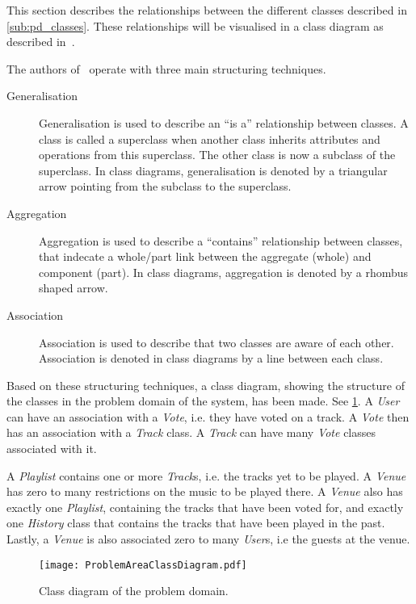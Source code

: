 This section describes the relationships between the different classes
described in \cref{sub:pd_classes}. These relationships will be
visualised in a class diagram as described
in~.

The authors of~ operate with three
main structuring techniques.

\begin{description}
\item[Generalisation] Generalisation is used to describe an \enquote{is a}
  relationship between classes. A class is called a
  superclass when another class inherits attributes and operations
  from this superclass. The other class is now a subclass of the
  superclass. In class diagrams, generalisation is denoted by a
  triangular arrow pointing from the subclass to the superclass.
\item[Aggregation] Aggregation is used to describe a
  \enquote{contains} relationship between classes, that indecate a whole/part link between the aggregate (whole) and component (part).  In class diagrams,
  aggregation is denoted by a rhombus shaped arrow.
\item[Association] Association is used to describe that two classes
  are aware of each other. Association is denoted in class diagrams by
  a line between each class.
\end{description}

Based on these structuring techniques, a class diagram, showing the
structure of the classes in the problem domain of the system, has been
made. See \cref{fig:pd_structure}. A \textit{User} can have an
association with a \textit{Vote}, i.e. they have voted on a track. A
\textit{Vote} then has an association with a \textit{Track} class. A
\textit{Track} can have many \textit{Vote} classes associated with
it.

A \textit{Playlist} contains one or more \textit{Track}s, i.e. the
tracks yet to be played. A \textit{Venue} has zero to many
restrictions on the music to be played there. A \textit{Venue} also
has exactly one \textit{Playlist}, containing the tracks that have
been voted for, and exactly one \textit{History} class that contains
the tracks that have been played in the past. Lastly, a \textit{Venue} is also associated zero to
many \textit{User}s, i.e the guests at the venue.

\begin{figure}[htbp]
  \centering
  \texttt{[image: ProblemAreaClassDiagram.pdf]}
  \caption{Class diagram of the problem domain.}\label{fig:pd_structure}
\end{figure}
